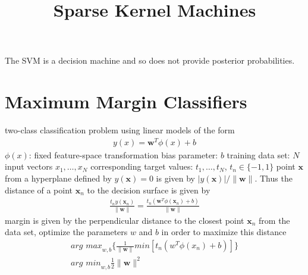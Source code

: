 \documentclass[a4paper]{article}
\begin{document}
\title{Sparse Kernel Machines}
\author{}
\maketitle

The SVM is a decision machine and so does not provide posterior probabilities.
\section{Maximum Margin Classiﬁers}
two-class classification problem using linear models of the form
\begin{align}
y(x) = \mathbf{w}^T\phi(x) + b
\end{align}
$\phi(x)$: fixed feature-space transformation
bias parameter: $b$
training data set: $N$ input vectors $x_1, \dotsc ,x_N$
corresponding target values: $t_1, \dotsc ,t_N$,  $t_n \in \{−1, 1\}$
point $\mathbf{x}$ from a hyperplane deﬁned by $y(\mathbf{x}) = 0$ is
given by $|y(\mathbf{x})| / \|\mathbf{w}\|$. Thus the distance of a
point $\mathbf{x}_n$ to the decision surface is given by
\begin{align}
\frac{t_n y(\mathbf{x}_n)}{\|\mathbf{w}\|} =
  \frac{t_n(\mathbf{w}^T\phi(\mathbf{x}_n) + b)}{\|\mathbf{w}\|}
\end{align}
margin is given by the perpendicular distance to the closest point $\mathbf{x}_n$
from the data set, optimize the parameters $w$ and $b$ in order to
maximize this distance
\begin{align}
\textit{arg max}_{w,b} \{ \frac{1}{\|\mathbf{w}\|} min[t_n(w^T\phi(x_n)+b)] \}\\
\textit{arg min}_{w,b} \frac{1}{2}\|\mathbf{w}\|^2
\end{align}
\end{document}
